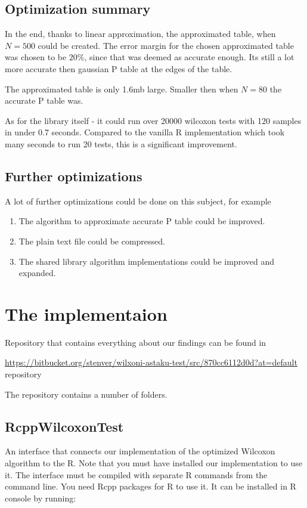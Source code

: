 \documentclass[12pt]{article}
\begin{document}
\subsection{Optimization summary}
In the end, thanks to linear approximation, the approximated table, when $N=500$ could be created. The error margin for the chosen approximated table was chosen to be $20\%$, since that was deemed as accurate enough. Its still a lot more accurate then gaussian P table at the edges of the table.

The approximated table is only 1.6mb large. Smaller then when $N=80$ the accurate P table was.

As for the library itself - it could run over 20000 wilcoxon tests with 120 samples in under 0.7 seconds. Compared to the vanilla R implementation which took many seconds to run 20 tests, this is a significant improvement.

\subsection{Further optimizations}
A lot of further optimizations could be done on this subject, for example

\begin{enumerate}
\item The algorithm to approximate accurate P table could be improved.
\item The plain text file could be compressed.
\item The shared library algorithm implementations could be improved and expanded.
\end{enumerate}

\newpage

\section{The implementaion}
Repository that contains everything about our findings can be found in

\url{https://bitbucket.org/stenver/wilxoni-astaku-test/src/870cc6112d0d?at=default} repository

The repository contains a number of folders.

\subsection{RcppWilcoxonTest}
 An interface that connects our implementation of the optimized Wilcoxon algorithm to the R. Note that you must have installed our implementation to use it. The interface must be compiled with separate R commands from the command line. You need Rcpp packages for R to use it. It can be installed in R console by running:
\end{document}
